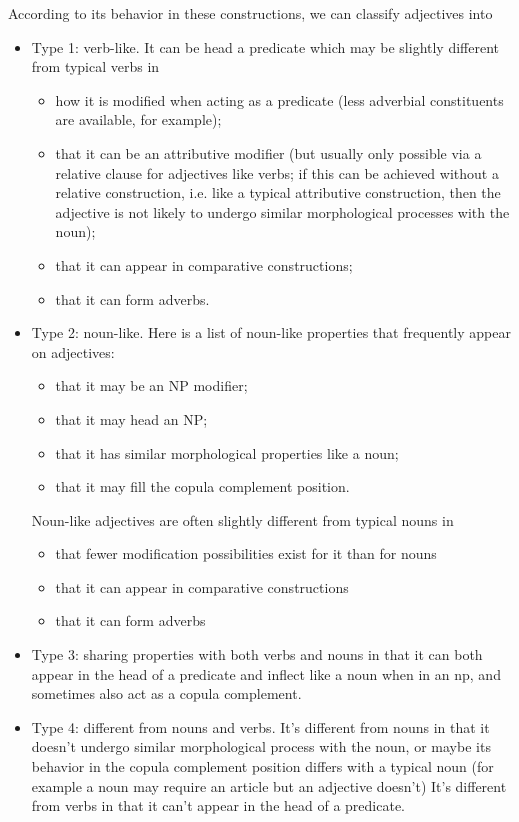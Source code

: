 \documentclass[UTF8, a4paper, oneside, scheme=plain]{ctexart}
\begin{document}
According to its behavior in these constructions, we can classify adjectives into
\begin{itemize}
    \item Type 1: verb-like. It can be head a predicate
    which may be slightly different from typical verbs in
    \begin{itemize}
        \item how it is modified when acting as a predicate 
        (less adverbial constituents are available, for example);
        \item that it can be an attributive modifier 
        (but usually only possible via a relative clause for adjectives like verbs; 
        if this can be achieved without a relative construction, i.e. like a typical attributive construction,
        then the adjective is not likely to undergo similar morphological processes with the noun);
        \item that it can appear in comparative constructions;
        \item that it can form adverbs.
    \end{itemize}
    \item Type 2: noun-like. Here is a list of noun-like properties that frequently appear on adjectives:
    \begin{itemize}
        \item that it may be an NP modifier;
        \item that it may head an NP;
        \item that it has similar morphological properties like a noun;
        \item that it may fill the copula complement position.
    \end{itemize}
    Noun-like adjectives are often slightly different from typical nouns in
    \begin{itemize}
        \item that fewer modification possibilities exist for it than for nouns
        \item that it can appear in comparative constructions
        \item that it can form adverbs
    \end{itemize}
    \item Type 3: sharing properties with both verbs and nouns
    in that it can both appear in the head of a predicate and
    inflect like a noun when in an \ac{np}, 
    and sometimes also act as a copula complement.
    \item Type 4: different from nouns and verbs.
    It's different from nouns in that
    it doesn't undergo similar morphological process with the noun, or maybe 
    its behavior in the copula complement position differs with a typical noun 
    (for example a noun may require an article but an adjective doesn't)
    It's different from verbs in that
    it can't appear in the head of a predicate.
\end{itemize}
\end{document}
